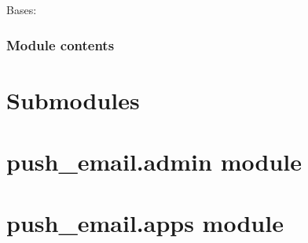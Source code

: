 \documentclass[letterpaper,10pt,english]{sphinxmanual}
\begin{document}
\begin{fulllineitems}
\label{push_email.migrations:push_email.migrations.0004_emailid.Migration}
Bases: 

\begin{fulllineitems}
\label{push_email.migrations:push_email.migrations.0004_emailid.Migration.dependencies}
\end{fulllineitems}


\begin{fulllineitems}
\label{push_email.migrations:push_email.migrations.0004_emailid.Migration.operations}
\end{fulllineitems}


\end{fulllineitems}



\subsubsection{Module contents}
\label{push_email.migrations:module-push_email.migrations}\label{push_email.migrations:module-contents}

\section{Submodules}
\label{push_email:submodules}

\section{push\_email.admin module}
\label{push_email:push-email-admin-module}\label{push_email:module-push_email.admin}

\section{push\_email.apps module}
\label{push_email:module-push_email.apps}\label{push_email:push-email-apps-module}
\end{document}
